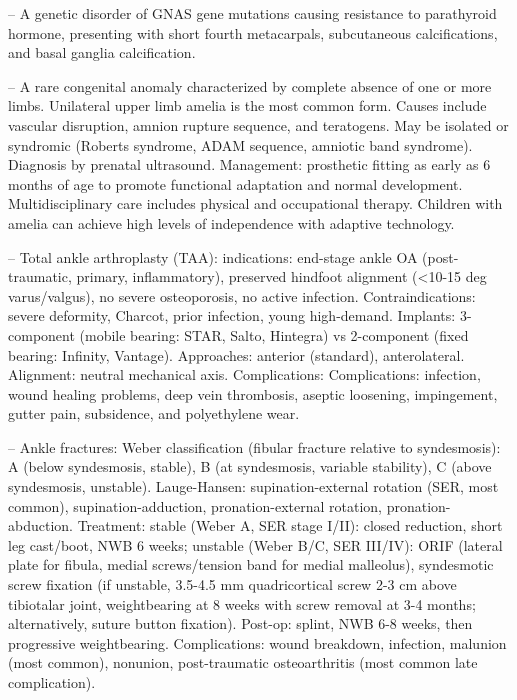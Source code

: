 -- A genetic disorder of GNAS gene mutations causing resistance to parathyroid hormone, presenting with short fourth metacarpals, subcutaneous calcifications, and basal ganglia calcification.

-- A rare congenital anomaly characterized by complete absence of one or more limbs. Unilateral upper limb amelia is the most common form. Causes include vascular disruption, amnion rupture sequence, and teratogens. May be isolated or syndromic (Roberts syndrome, ADAM sequence, amniotic band syndrome). Diagnosis by prenatal ultrasound. Management: prosthetic fitting as early as 6 months of age to promote functional adaptation and normal development. Multidisciplinary care includes physical and occupational therapy. Children with amelia can achieve high levels of independence with adaptive technology.

-- Total ankle arthroplasty (TAA): indications: end-stage ankle OA (post-traumatic, primary, inflammatory), preserved hindfoot alignment (<10-15 deg varus/valgus), no severe osteoporosis, no active infection. Contraindications: severe deformity, Charcot, prior infection, young high-demand. Implants: 3-component (mobile bearing: STAR, Salto, Hintegra) vs 2-component (fixed bearing: Infinity, Vantage). Approaches: anterior (standard), anterolateral. Alignment: neutral mechanical axis. Complications: Complications: infection, wound healing problems, deep vein thrombosis, aseptic loosening, impingement, gutter pain, subsidence, and polyethylene wear.

-- Ankle fractures: Weber classification (fibular fracture relative to syndesmosis): A (below syndesmosis, stable), B (at syndesmosis, variable stability), C (above syndesmosis, unstable). Lauge-Hansen: supination-external rotation (SER, most common), supination-adduction, pronation-external rotation, pronation-abduction. Treatment: stable (Weber A, SER stage I/II): closed reduction, short leg cast/boot, NWB 6 weeks; unstable (Weber B/C, SER III/IV): ORIF (lateral plate for fibula, medial screws/tension band for medial malleolus), syndesmotic screw fixation (if unstable, 3.5-4.5 mm quadricortical screw 2-3 cm above tibiotalar joint, weightbearing at 8 weeks with screw removal at 3-4 months; alternatively, suture button fixation). Post-op: splint, NWB 6-8 weeks, then progressive weightbearing. Complications: wound breakdown, infection, malunion (most common), nonunion, post-traumatic osteoarthritis (most common late complication).

